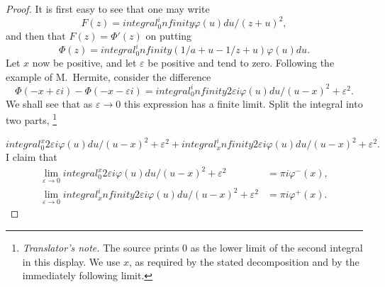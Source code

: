 \documentclass[
  paper=b5,
  fontsize=13pt,
  twoside,
  headings=normal,
  bookmarkpackage=false
]{scrartcl}
\theoremstyle{stieltjesplain}
\theoremstyle{stieltjesdefinition}
\newcommand{\translatornote}[1]{%
  \footnote{\textit{Translator's note.} #1}%
}
\def\int{integral}%
\def\frac#1#2{#1/#2}%
\def\infty{infinity}%
\def\,{ }%
\begin{document}
\begin{proof}
It is first easy to see that one may write
\[
  F(z)=\int_0^\infty\frac{\varphi(u)\,du}{(z+u)^2},
\]
and then that $F(z)=\Phi'(z)$ on putting
\[
  \Phi(z)=\int_0^\infty
  \left(\frac{1}{a+u}-\frac{1}{z+u}\right)\varphi(u)\,du.
\]
Let $x$ now be positive, and let $\varepsilon$ be positive and tend to zero. Following the example of M.~Hermite, consider the difference
\[
  \Phi(-x+\varepsilon i)-\Phi(-x-\varepsilon i)
  =\int_0^\infty\frac{2\varepsilon i\,\varphi(u)\,du}
  {(u-x)^2+\varepsilon^2}.
\]
We shall see that as $\varepsilon\to0$ this expression has a finite limit. Split the integral into two parts,\translatornote{The source prints $0$ as the lower limit of the second integral in this display. We use $x$, as required by the stated decomposition and by the immediately following limit.}
\[
  \int_0^x\frac{2\varepsilon i\,\varphi(u)\,du}{(u-x)^2+\varepsilon^2}
  +\int_x^\infty\frac{2\varepsilon i\,\varphi(u)\,du}{(u-x)^2+\varepsilon^2}.
\]
I claim that
\begin{align*}
 \lim_{\varepsilon\to0}\int_0^x
  \frac{2\varepsilon i\,\varphi(u)\,du}{(u-x)^2+\varepsilon^2}
  &=\pi i\,\varphi^{-}(x),\\
 \lim_{\varepsilon\to0}\int_x^\infty
  \frac{2\varepsilon i\,\varphi(u)\,du}{(u-x)^2+\varepsilon^2}
  &=\pi i\,\varphi^{+}(x).
\end{align*}


\end{proof}
\end{document}
